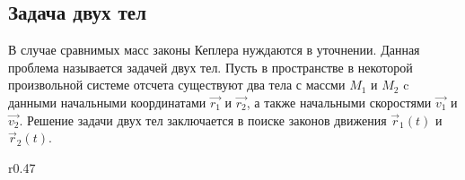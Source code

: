 \subsection{Задача двух тел}
В случае сравнимых масс законы Кеплера нуждаются в уточнении. Данная проблема называется задачей двух тел. Пусть в пространстве в некоторой произвольной системе отсчета существуют два тела с массми $M_1$ и $M_2$ c данными начальными координатами $\vec{r_1}$ и $\vec{r_2}$, а также начальными скоростями $\vec{v_1}$ и $\vec{v_2}$. Решение задачи двух тел заключается в поиске законов движения $\vec{r}_1(t)$ и $\vec{r}_2(t)$.

\begin{wrapfigure}[7]{r}{0.47\tw}
    \centering
    \vspace{-1pc}
    \caption{}
    \label{pic:reduced-mass}    
\end{wrapfigure}

